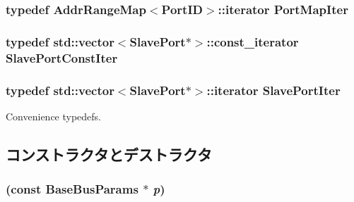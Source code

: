 \label{classBaseBus_ad31cae2c5a87fd020ee036a5d94c7420}
\hypertarget{classBaseBus_adedf751dd92daa01137db6149c004ea7}{
\subsubsection[{PortMapIter}]{\setlength{\rightskip}{0pt plus 5cm}typedef {\bf AddrRangeMap}$<${\bf PortID}$>$::iterator {\bf PortMapIter}}}
\label{classBaseBus_adedf751dd92daa01137db6149c004ea7}
\hypertarget{classBaseBus_a4cfbb26aa06c3132b77227f45f39e224}{
\subsubsection[{SlavePortConstIter}]{\setlength{\rightskip}{0pt plus 5cm}typedef {\bf std::vector}$<${\bf SlavePort}$\ast$$>$::const\_\-iterator {\bf SlavePortConstIter}}}
\label{classBaseBus_a4cfbb26aa06c3132b77227f45f39e224}
\hypertarget{classBaseBus_a2b00f9fc9ba7e236c9757ea764cda19d}{
\subsubsection[{SlavePortIter}]{\setlength{\rightskip}{0pt plus 5cm}typedef {\bf std::vector}$<${\bf SlavePort}$\ast$$>$::iterator {\bf SlavePortIter}}}
\label{classBaseBus_a2b00f9fc9ba7e236c9757ea764cda19d}
Convenience typedefs. 

\subsection{コンストラクタとデストラクタ}
\hypertarget{classBaseBus_aafbb881b411bf8ecd7696a6b6c9fbf5c}{
\subsubsection[{BaseBus}]{ (const BaseBusParams $\ast$ {\em p})}}
\label{classBaseBus_aafbb881b411bf8ecd7696a6b6c9fbf5c}



